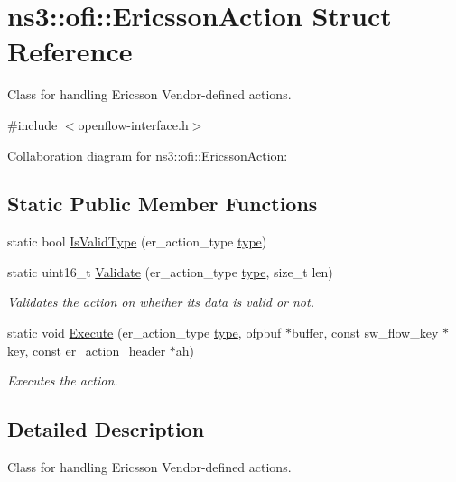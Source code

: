 \hypertarget{structns3_1_1ofi_1_1EricssonAction}{}\section{ns3\+:\+:ofi\+:\+:Ericsson\+Action Struct Reference}
\label{structns3_1_1ofi_1_1EricssonAction}


Class for handling Ericsson Vendor-\/defined actions.  




{\ttfamily \#include $<$openflow-\/interface.\+h$>$}



Collaboration diagram for ns3\+:\+:ofi\+:\+:Ericsson\+Action\+:
\subsection*{Static Public Member Functions}
\begin{DoxyCompactItemize}
\item 
static bool \hyperlink{structns3_1_1ofi_1_1EricssonAction_a1c619e29285cbc1964a9b6df9d33b162}{Is\+Valid\+Type} (er\+\_\+action\+\_\+type \hyperlink{visualizer-ideas_8txt_add98db9e15e2a58cf2b57623e7aa893a}{type})
\item 
static uint16\+\_\+t \hyperlink{structns3_1_1ofi_1_1EricssonAction_a9af483113ebe19ab9dd9bc8a2468ea3b}{Validate} (er\+\_\+action\+\_\+type \hyperlink{visualizer-ideas_8txt_add98db9e15e2a58cf2b57623e7aa893a}{type}, size\+\_\+t len)
\begin{DoxyCompactList}\small\item\em Validates the action on whether its data is valid or not. \end{DoxyCompactList}\item 
static void \hyperlink{structns3_1_1ofi_1_1EricssonAction_aac465fd92367d80978a090f0118250ae}{Execute} (er\+\_\+action\+\_\+type \hyperlink{visualizer-ideas_8txt_add98db9e15e2a58cf2b57623e7aa893a}{type}, ofpbuf $\ast$buffer, const sw\+\_\+flow\+\_\+key $\ast$key, const er\+\_\+action\+\_\+header $\ast$ah)
\begin{DoxyCompactList}\small\item\em Executes the action. \end{DoxyCompactList}\end{DoxyCompactItemize}


\subsection{Detailed Description}
Class for handling Ericsson Vendor-\/defined actions. 

